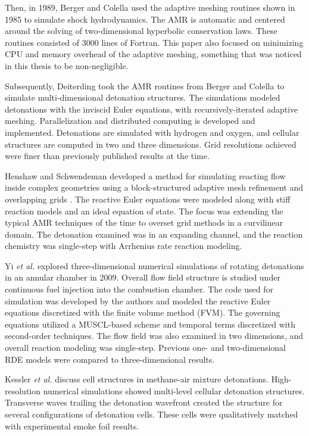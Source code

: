 Then, in 1989, Berger and Colella  \cite{berger1989} used the adaptive meshing routines shown in 1985 to simulate shock hydrodynamics. The AMR is automatic and centered around the solving of two-dimensional hyperbolic conservation laws. These routines consisted of 3000 lines of Fortran. This paper also focused on minimizing CPU and memory overhead of the adaptive meshing, something that was noticed in this thesis to be non-negligible. 

Subsequently, Deiterding  \cite{deiterding} took the AMR routines from Berger and Colella to simulate multi-dimensional detonation structures. The simulations modeled detonations with the inviscid Euler equations, with recursively-iterated adaptive meshing. Parallelization and distributed computing is developed and implemented. Detonations are simulated with hydrogen and oxygen, and cellular structures are computed in two and three dimensions. Grid resolutions achieved were finer than previously published results at the time. 

Henshaw and Schwendeman developed a method \cite{henshaw} for simulating reacting flow inside complex geometries using a block-structured adaptive mesh refinement and overlapping grids . The reactive Euler equations were modeled along with stiff reaction models and an ideal equation of state. The focus was extending the typical AMR techniques of the time to overset grid methods in a curvilinear domain. The detonation examined was in an expanding channel, and the reaction chemistry was single-step with Arrhenius rate reaction modeling. 

Yi \textit{et al.} \cite{yi} explored three-dimensional numerical simulations of rotating detonations in an annular chamber in 2009. Overall flow field structure is studied under continuous fuel injection into the combustion chamber. The code used for simulation was developed by the authors and modeled the reactive Euler equations discretized with the finite volume method (FVM). The governing equations utilized a MUSCL-based scheme \cite{vanleer} and temporal terms discretized with second-order techniques. The flow field was also examined in two dimensions, and overall reaction modeling was single-step. Previous one- and two-dimensional RDE models were compared to three-dimensional results. 

Kessler \textit{et al.} \cite{kessler} discuss cell structures in methane-air mixture detonations. High-resolution numerical simulations showed multi-level cellular detonation structures. Transverse waves trailing the detonation wavefront created the structure for several configurations of detonation cells. These cells were qualitatively matched with experimental smoke foil results. 

